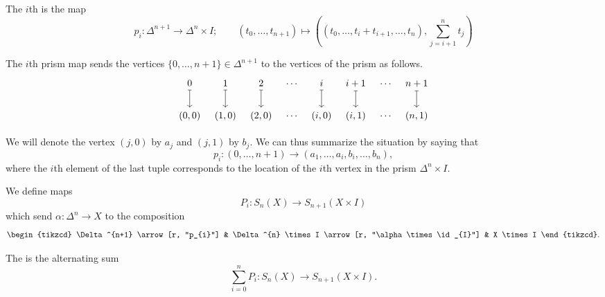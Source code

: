\documentclass[main.tex]{subfiles}
\begin{document}
\begin{definition}
  \label{def:prism_maps}
  The \(i\)th  is the map
  \begin{equation*}
    p_{i}\colon \Delta^{n+1} \to \Delta^{n} \times I;\qquad (t_{0}, \ldots, t_{n+1}) \mapsto \left((t_{0}, \ldots, t_{i} + t_{i+1}, \ldots, t_{n}), \sum_{j = i+1}^{n} t_{j}\right)
  \end{equation*}
\end{definition}

The \(i\)th prism map sends the vertices \(\{0, \ldots, n + 1\} \in \Delta^{n+1}\) to the vertices of the prism as follows.
\begin{equation*}
  \begin{tikzcd}[column sep=tiny]
    0
    \arrow[d, mapsto]
    & 1
    \arrow[d, mapsto]
    & 2
    \arrow[d, mapsto]
    & \cdots
    & i
    \arrow[d, mapsto]
    & i+1
    \arrow[d, mapsto]
    & \cdots
    & n+1
    \arrow[d, mapsto]
    \\
    (0, 0)
    & (1, 0)
    & (2, 0)
    & \cdots
    & (i, 0)
    & (i, 1)
    & \cdots
    & (n, 1)
  \end{tikzcd}
\end{equation*}

We will denote the vertex \((j, 0)\) by \(a_{j}\) and \((j, 1)\) by \(b_{j}\). We can thus summarize the situation by saying that
\begin{equation*}
  p_{i}\colon (0, \ldots, n+1) \to (a_{1}, \ldots, a_{i}, b_{i}, \ldots, b_{n}),
\end{equation*}
where the \(i\)th element of the last tuple corresponds to the location of the \(i\)th vertex in the prism \(\Delta^{n} \times I\).

\begin{definition}
  \label{def:prism_operator}
  We define maps
  \begin{equation*}
    P_{i}\colon S_{n}(X) \to S_{n+1}(X \times I)
  \end{equation*}
  which send \(\alpha\colon \Delta^{n} \to X\) to the composition
  \begin{equation*}
    \begin{tikzcd}
      \Delta^{n+1}
      \arrow[r, "p_{i}"]
      & \Delta^{n} \times I
      \arrow[r, "\alpha \times \id_{I}"]
      & X \times I
    \end{tikzcd}.
  \end{equation*}

  The  is the alternating sum
  \begin{equation*}
    \sum_{i = 0}^{n} P_{i}\colon S_{n}(X) \to S_{n+1}(X \times I).
  \end{equation*}
\end{definition}
\end{document}
